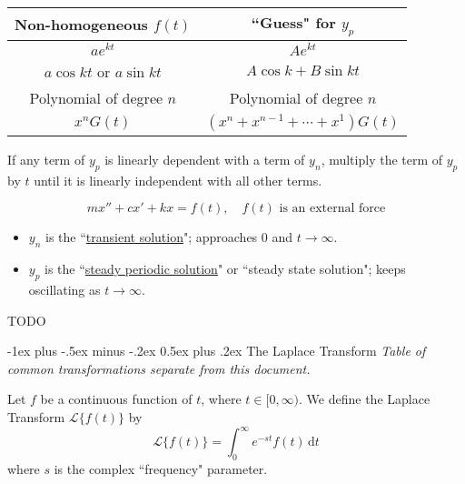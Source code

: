 \documentclass[10pt,landscape,letterpaper]{article}
\makeatletter
\renewcommand{\section}{\@startsection{section}{1}{0mm}%
                                {-1ex plus -.5ex minus -.2ex}%
                                {0.5ex plus .2ex}%
                                {\normalfont\large\bfseries}}
\newcommand\cheatsheetmargin{0.2cm}
\makeatother
\begin{document}
\begin{multicols}{3}
\begin{minipage}{\columnwidth}
\begin{description}[style=unboxed,leftmargin=\cheatsheetmargin]
    \renewcommand{\arraystretch}{1.5}
    \item \begin{tabular}{|c|c|}
        \hline
        \textbf{Non-homogeneous $f(t)$} & \textbf{``Guess" for $y_p$} \\
        \hline
        $ae^{kt}$ & $Ae^{kt}$ \\
        $a\cos k t$ or $a\sin k t$ &  $A\cos k + B\sin k t$ \\
        Polynomial of degree $n$ & Polynomial of degree $n$ \\
        $x^nG(t)$ & $(x^n + x^{n-1} +\cdots+ x^1)G(t)$ \\
        \hline
    \end{tabular}
    \item[Important:]
        If any term of $y_p$ is linearly dependent with a term of $y_n$, multiply the term of $y_p$ by $t$ until it is linearly independent with all other terms.
   \item[Forced Mechanical Vibrations]
   \begin{equation*}
   mx'' + cx' + kx = f(t), \quad f(t) \text{ is an external force}
   \end{equation*}
   \begin{itemize}
       \item$y_n$ is the ``\underline{transient solution}"; approaches 0 and $t \to \infty$.
       \item$y_p$ is the ``\underline{steady periodic solution}" or ``steady state solution"; keeps oscillating as $t\to \infty$.
   \end{itemize}
    \item[Resonance] TODO
\end{description}


\section{The Laplace Transform}
\textit{\scriptsize * Table of common transformations separate from this document.}

Let $f$ be a continuous function of $t$, where $t \in [0, \infty)$. We define the Laplace Transform $\mathcal L\{f(t)\}$ by
\begin{equation*}
\mathcal L\{f(t)\} = \int_0^\infty e^{-st} f(t) \, \mathrm dt
\end{equation*}
where $s$ is the complex ``frequency" parameter.


\end{minipage}
\end{multicols}
\end{document}
